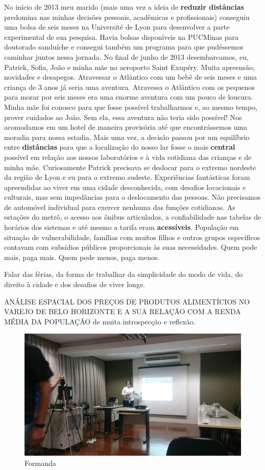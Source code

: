 \documentclass[
]{book}
\begin{document}
No início de 2013 meu marido (mais uma vez a ideia de \textbf{reduzir
distâncias} predomina nas minhas decisões pessoais, acadêmicas e
profissionais) conseguiu uma bolsa de seis meses na Université de Lyon
para desenvolver a parte experimental de sua pesquisa. Havia bolsas
disponíveis na PUCMinas para doutorado sanduíche e consegui também um
programa para que pudéssemos caminhar juntos nessa jornada. No final de
junho de 2013 desembarcamos, eu, Patrick, Sofia, João e minha mãe no
aeroporto Saint Exupéry. Muita apreensão, novidades e desapegos.
Atravessar o Atlântico com um bebê de seis meses e uma criança de 3 anos
já seria uma aventura. Atravessa o Atlântico com os pequenos para morar
por seis meses era uma enorme aventura com um pouco de loucura. Minha
mãe foi conosco para que fosse possível trabalharmos e, ao mesmo tempo,
prover cuidados ao João. Sem ela, essa aventura não teria sido possível!
Nos acomodamos em um hotel de maneira provisória até que encontrássemos
uma moradia para nossa estadia. Mais uma vez, a decisão passou por um
equilíbrio entre \textbf{distâncias} para que a localização do nosso lar
fosse o mais \textbf{central} possível em relação aos nossos
laboratórios e à vida cotidiana das crianças e de minha mãe.
Curiosamente Patrick precisava se deslocar para o extremo nordeste da
região de Lyon e eu para o extremo sudeste. Experiências fantásticas
foram apreendidas ao viver em uma cidade desconhecida, com desafios
locacionais e culturais, mas sem impedâncias para o deslocamento das
pessoas. Não precisamos de automóvel individual para exercer nenhuma das
funções cotidianas. As estações do metrô, o acesso aos ônibus
articulados, a confiabilidade nas tabelas de horários dos sistemas e até
mesmo a tarifa eram \textbf{acessíveis}. População em situação de
vulnerabilidade, famílias com muitos filhos e outros grupos específicos
contavam com subsídios públicos proporcionais às suas necessidades. Quem
pode mais, paga mais. Quem pode menos, paga menos.

Falar das férias, da forma de trabalhar da simplicidade do modo de vida,
do direito à cidade e dos desafios de viver longe.

ANÁLISE ESPACIAL DOS PREÇOS DE PRODUTOS ALIMENTÍCIOS NO VAREJO DE BELO
HORIZONTE E A SUA RELAÇÃO COM A RENDA MÉDIA DA POPULAÇÃO de muita
introspecção e reflexão.

\begin{figure}
\includegraphics[width=1\linewidth]{img/defesa} \caption{Formanda}\label{fig:defesa}
\end{figure}
\end{document}

